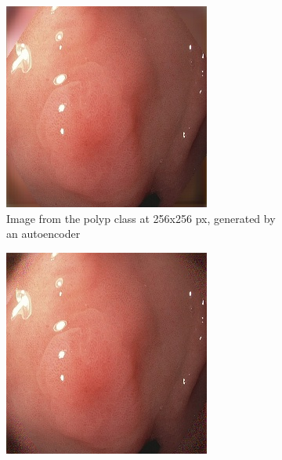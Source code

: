        \begin{figure}[h]
        \centering
        \begin{subfigure}[t]{0.4\textwidth}
            \centering
            \includegraphics[width=\textwidth]{experiments/figures/blackcorner/polypAE.jpg}
            \caption{Image from the polyp class at 256x256 px, generated by an autoencoder }    
            \label{fig:polyp_AE_CORNER1}
        \end{subfigure}
        \qquad
        \begin{subfigure}[t]{0.4\textwidth}  
            \centering 
            \includegraphics[width=\textwidth]{experiments/figures/blackcorner/polypGAN.jpg}

\end{subfigure}
\end{figure}
